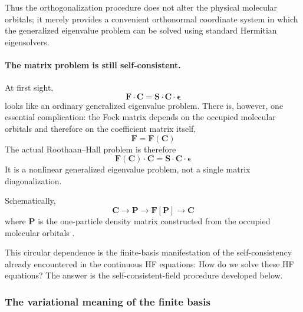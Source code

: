 \documentclass[11pt,a4paper,titlepage]{article}
\numberwithin{equation}{section}
\newcommand{\bC}{\boldsymbol{C}}
\newcommand{\bF}{\boldsymbol{F}}
\newcommand{\bP}{\boldsymbol{P}}
\newcommand{\bS}{\boldsymbol{S}}
\newcommand{\beps}{\boldsymbol{\epsilon}}
\begin{document}
Thus the orthogonalization procedure does not alter the physical molecular
orbitals; it merely provides a convenient orthonormal coordinate system in
which the generalized eigenvalue problem can be solved using standard
Hermitian eigensolvers.


\paragraph{The matrix problem is still self-consistent.}

At first sight,
\begin{equation}
  \bF\cdot\bC
  =
  \bS\cdot\bC\cdot\beps
\end{equation}
looks like an ordinary generalized eigenvalue problem. There is, however,
one essential complication: the Fock matrix depends on the occupied
molecular orbitals and therefore on the coefficient matrix itself,
\begin{equation}
  \bF
  =
  \bF(\bC)
\end{equation}
The actual Roothaan--Hall problem is therefore
\begin{equation}
  \bF(\bC)\cdot\bC
  =
  \bS\cdot\bC\cdot\beps
  \label{eq:nonlinear-roothaan-hall}
\end{equation}
It is a nonlinear generalized eigenvalue problem, not a single matrix
diagonalization.

Schematically,
\begin{equation}
  \bC
  \longrightarrow
  \bP
  \longrightarrow
  \bF[\bP]
  \longrightarrow
  \bC
\end{equation}
where $\bP$ is the one-particle density matrix constructed from the occupied
molecular orbitals \citep{McWeeny1960}.

\hfBioMcWeeny

This circular dependence is the finite-basis manifestation of the
self-consistency already encountered in the continuous HF equations:
How do we solve these HF equations?
The answer is the self-consistent-field procedure developed below.


\subsubsection{The variational meaning of the finite basis}
\end{document}
